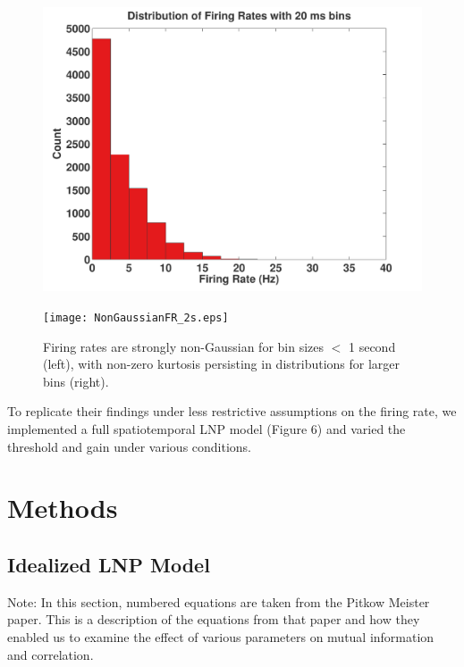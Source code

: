 \documentclass[12pt]{article}
\begin{document}
\begin{figure}[h!!]
\centering
\begin{minipage}[b]{0.45\linewidth}
\centering
\includegraphics[width=\textwidth]{NonGaussianFR.pdf}
\end{minipage}
\begin{minipage}[b]{0.45\linewidth}
\centering
\texttt{[image: NonGaussianFR\_2s.eps]}
\end{minipage}
\caption{Firing rates are strongly non-Gaussian for bin sizes $<$ 1 second (left), with non-zero kurtosis persisting in distributions for larger bins (right).}
\label{Figure 5}
\end{figure}

To replicate their findings under less restrictive assumptions on the firing rate, we implemented a full spatiotemporal LNP model (Figure 6) and varied the threshold and gain under various conditions.



\section{Methods}

\subsection{Idealized LNP Model}

Note: In this section, numbered equations are taken from the Pitkow Meister paper. This is a description of the equations from that paper and how they enabled us to examine the effect of various parameters on mutual information and correlation.
\end{document}
